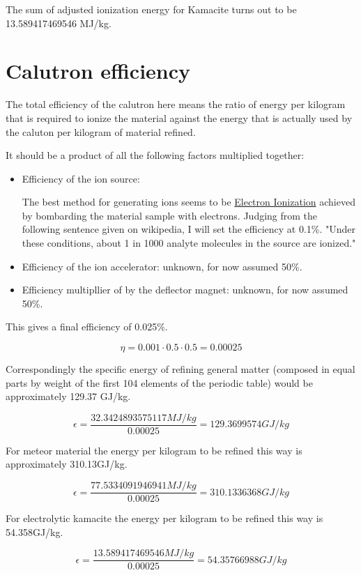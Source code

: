 \documentclass[a4paper]{article}
\begin{document}
	\normalsize
	
	The sum of adjusted ionization energy for Kamacite turns out to be 13.589417469546 MJ/kg.
	
	\pagebreak
	
	\section{Calutron efficiency}
	
    The total efficiency of the calutron here means the ratio of energy per kilogram that is required to ionize the material against the energy that is actually used by the caluton per kilogram of material refined.
    
    \medskip
    
    It should be a product of all the following factors multiplied together:
    
    \begin{itemize}
    	\item Efficiency of the ion source:
    	
    	The best method for generating ions seems to be \href{https://en.wikipedia.org/wiki/Electron_ionization#The_efficiency_of_EI}{Electron Ionization} achieved by bombarding the material sample with electrons.
    	Judging from the following sentence given on wikipedia, I will set the efficiency at 0.1\%.
    	"Under these conditions, about 1 in 1000 analyte molecules in the source are ionized."
    	
    	\item Efficiency of the ion accelerator: unknown, for now assumed 50\%.
    	
    	\item Efficiency multipllier of by the deflector magnet: unknown, for now assumed 50\%.
    \end{itemize}
    
    This gives a final efficiency of 0.025\%.
    
    $$ \eta = 0.001 \cdot 0.5 \cdot 0.5 = 0.00025 $$
    
    Correspondingly the specific energy of refining general matter (composed in equal parts by weight of the first 104 elements of the periodic table) would be approximately 129.37 GJ/kg.
    
    $$ \epsilon = \frac{32.3424893575117 MJ/kg}{0.00025} = 129.3699574 GJ/kg $$
    
    For meteor material the energy per kilogram to be refined this way is approximately 310.13GJ/kg.
    
    $$ \epsilon = \frac{77.5334091946941 MJ/kg}{0.00025} = 310.1336368 GJ/kg $$
    
    For electrolytic kamacite the energy per kilogram to be refined this way is 54.358GJ/kg.
    
    $$ \epsilon = \frac{13.589417469546 MJ/kg}{0.00025} = 54.35766988 GJ/kg $$
	
\end{document}
